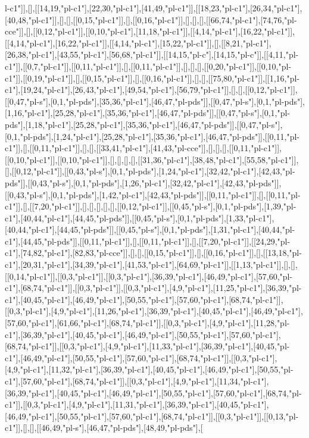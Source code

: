 l-c1"]],[],[[14,19,"pl-c1"],[22,30,"pl-c1"],[41,49,"pl-c1"]],[[18,23,"pl-c1"],[26,34,"pl-c1"],[40,48,"pl-c1"]],[],[],[[0,15,"pl-c1"]],[],[[0,16,"pl-c1"]],[],[],[],[[66,74,"pl-c1"],[74,76,"pl-cce"]],[],[[0,12,"pl-c1"]],[[0,10,"pl-c1"],[11,18,"pl-c1"]],[[4,14,"pl-c1"],[16,22,"pl-c1"]],[[4,14,"pl-c1"],[16,22,"pl-c1"]],[[4,14,"pl-c1"],[15,22,"pl-c1"]],[],[[8,21,"pl-c1"],[26,38,"pl-c1"],[43,55,"pl-c1"],[56,68,"pl-c1"]],[[14,15,"pl-c"],[14,15,"pl-c"]],[[4,11,"pl-c1"]],[[0,7,"pl-c1"]],[[0,11,"pl-c1"]],[],[[0,11,"pl-c1"]],[],[],[],[[0,20,"pl-c1"]],[[0,10,"pl-c1"]],[[0,19,"pl-c1"]],[],[[0,15,"pl-c1"]],[],[[0,16,"pl-c1"]],[],[],[[75,80,"pl-c1"]],[[1,16,"pl-c1"],[19,24,"pl-c1"],[26,43,"pl-c1"],[49,54,"pl-c1"],[56,79,"pl-c1"]],[],[],[[0,12,"pl-c1"]],[[0,47,"pl-s"],[0,1,"pl-pds"],[35,36,"pl-c1"],[46,47,"pl-pds"]],[[0,47,"pl-s"],[0,1,"pl-pds"],[1,16,"pl-c1"],[25,28,"pl-c1"],[35,36,"pl-c1"],[46,47,"pl-pds"]],[[0,47,"pl-s"],[0,1,"pl-pds"],[1,18,"pl-c1"],[25,28,"pl-c1"],[35,36,"pl-c1"],[46,47,"pl-pds"]],[[0,47,"pl-s"],[0,1,"pl-pds"],[1,24,"pl-c1"],[25,28,"pl-c1"],[35,36,"pl-c1"],[46,47,"pl-pds"]],[[0,11,"pl-c1"]],[],[[0,11,"pl-c1"]],[],[],[[33,41,"pl-c1"],[41,43,"pl-cce"]],[],[],[],[[0,11,"pl-c1"]],[[0,10,"pl-c1"]],[[0,10,"pl-c1"]],[],[],[],[],[[31,36,"pl-c1"],[38,48,"pl-c1"],[55,58,"pl-c1"]],[],[[0,12,"pl-c1"]],[[0,43,"pl-s"],[0,1,"pl-pds"],[1,24,"pl-c1"],[32,42,"pl-c1"],[42,43,"pl-pds"]],[[0,43,"pl-s"],[0,1,"pl-pds"],[1,26,"pl-c1"],[32,42,"pl-c1"],[42,43,"pl-pds"]],[[0,43,"pl-s"],[0,1,"pl-pds"],[1,42,"pl-c1"],[42,43,"pl-pds"]],[[0,11,"pl-c1"]],[],[[0,11,"pl-c1"]],[],[[7,20,"pl-c1"]],[],[],[],[],[],[[0,12,"pl-c1"]],[[0,45,"pl-s"],[0,1,"pl-pds"],[1,39,"pl-c1"],[40,44,"pl-c1"],[44,45,"pl-pds"]],[[0,45,"pl-s"],[0,1,"pl-pds"],[1,33,"pl-c1"],[40,44,"pl-c1"],[44,45,"pl-pds"]],[[0,45,"pl-s"],[0,1,"pl-pds"],[1,31,"pl-c1"],[40,44,"pl-c1"],[44,45,"pl-pds"]],[[0,11,"pl-c1"]],[],[[0,11,"pl-c1"]],[],[[7,20,"pl-c1"]],[[24,29,"pl-c1"],[74,82,"pl-c1"],[82,83,"pl-cce"]],[],[],[[0,15,"pl-c1"]],[],[[0,16,"pl-c1"]],[],[[13,18,"pl-c1"],[20,31,"pl-c1"],[34,39,"pl-c1"],[41,53,"pl-c1"],[64,69,"pl-c1"]],[[1,13,"pl-c1"]],[],[],[[0,14,"pl-c1"]],[[0,3,"pl-c1"]],[[0,3,"pl-c1"],[36,39,"pl-c1"],[46,49,"pl-c1"],[57,60,"pl-c1"],[68,74,"pl-c1"]],[[0,3,"pl-c1"]],[[0,3,"pl-c1"],[4,9,"pl-c1"],[11,25,"pl-c1"],[36,39,"pl-c1"],[40,45,"pl-c1"],[46,49,"pl-c1"],[50,55,"pl-c1"],[57,60,"pl-c1"],[68,74,"pl-c1"]],[[0,3,"pl-c1"],[4,9,"pl-c1"],[11,26,"pl-c1"],[36,39,"pl-c1"],[40,45,"pl-c1"],[46,49,"pl-c1"],[57,60,"pl-c1"],[61,66,"pl-c1"],[68,74,"pl-c1"]],[[0,3,"pl-c1"],[4,9,"pl-c1"],[11,28,"pl-c1"],[36,39,"pl-c1"],[40,45,"pl-c1"],[46,49,"pl-c1"],[50,55,"pl-c1"],[57,60,"pl-c1"],[68,74,"pl-c1"]],[[0,3,"pl-c1"],[4,9,"pl-c1"],[11,33,"pl-c1"],[36,39,"pl-c1"],[40,45,"pl-c1"],[46,49,"pl-c1"],[50,55,"pl-c1"],[57,60,"pl-c1"],[68,74,"pl-c1"]],[[0,3,"pl-c1"],[4,9,"pl-c1"],[11,32,"pl-c1"],[36,39,"pl-c1"],[40,45,"pl-c1"],[46,49,"pl-c1"],[50,55,"pl-c1"],[57,60,"pl-c1"],[68,74,"pl-c1"]],[[0,3,"pl-c1"],[4,9,"pl-c1"],[11,34,"pl-c1"],[36,39,"pl-c1"],[40,45,"pl-c1"],[46,49,"pl-c1"],[50,55,"pl-c1"],[57,60,"pl-c1"],[68,74,"pl-c1"]],[[0,3,"pl-c1"],[4,9,"pl-c1"],[11,31,"pl-c1"],[36,39,"pl-c1"],[40,45,"pl-c1"],[46,49,"pl-c1"],[50,55,"pl-c1"],[57,60,"pl-c1"],[68,74,"pl-c1"]],[[0,3,"pl-c1"]],[[0,13,"pl-c1"]],[],[],[[46,49,"pl-s"],[46,47,"pl-pds"],[48,49,"pl-pds"],[